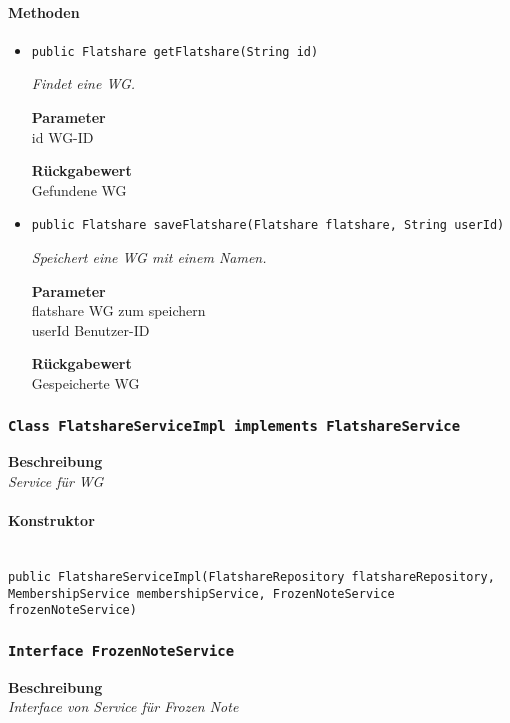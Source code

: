     \paragraph*{Methoden}
    \begin{itemize}
    	\item{\texttt{public Flatshare getFlatshare(String id)}}
    	
    	\textit{Findet eine WG.}
    	
    	\textbf{Parameter} \\
    	id WG-ID
    	
    	\textbf{Rückgabewert} \\
    	Gefundene WG        \item{\texttt{public Flatshare saveFlatshare(Flatshare flatshare, String userId)}}
    	
    	\textit{Speichert eine WG mit einem Namen.}
    	
    	\textbf{Parameter} \\
    	flatshare WG zum speichern\\
    	userId Benutzer-ID
    	
    	\textbf{Rückgabewert} \\
    	Gespeicherte WG
    \end{itemize}
    \subsubsection{\texttt{Class FlatshareServiceImpl implements FlatshareService}}
    \textbf{Beschreibung} \\
    \textit{Service für WG}
    \paragraph*{Konstruktor}\mbox{} \\
    \texttt{public FlatshareServiceImpl(FlatshareRepository flatshareRepository, MembershipService membershipService, FrozenNoteService frozenNoteService)} \\
    \subsubsection{\texttt{Interface FrozenNoteService}}
    \textbf{Beschreibung} \\
    \textit{Interface von Service für Frozen Note}
